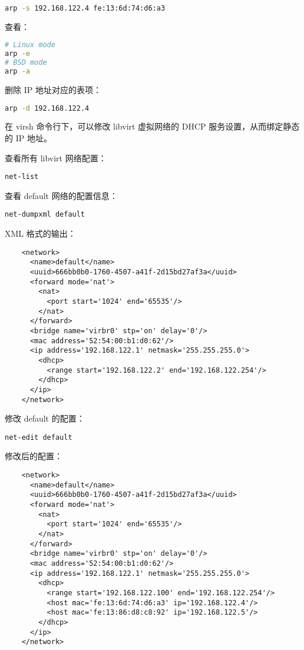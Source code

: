 \begin{enumerate}
\begin{lstlisting}[language=bash]
arp -s 192.168.122.4 fe:13:6d:74:d6:a3
\end{lstlisting}

查看：

\begin{lstlisting}[language=bash]
# Linux mode
arp -e
# BSD mode
arp -a
\end{lstlisting}

删除 IP 地址对应的表项：

\begin{lstlisting}[language=bash]
arp -d 192.168.122.4
\end{lstlisting}

在 virsh 命令行下，可以修改 libvirt 虚拟网络的 DHCP 服务设置，从而绑定静态的 IP 地址。

查看所有 libvirt 网络配置：

\begin{lstlisting}
net-list
\end{lstlisting}

查看 default 网络的配置信息：

\begin{lstlisting}
net-dumpxml default
\end{lstlisting}

XML 格式的输出：

\begin{lstlisting}
    <network>
      <name>default</name>
      <uuid>666bb0b0-1760-4507-a41f-2d15bd27af3a</uuid>
      <forward mode='nat'>
        <nat>
          <port start='1024' end='65535'/>
        </nat>
      </forward>
      <bridge name='virbr0' stp='on' delay='0'/>
      <mac address='52:54:00:b1:d0:62'/>
      <ip address='192.168.122.1' netmask='255.255.255.0'>
        <dhcp>
          <range start='192.168.122.2' end='192.168.122.254'/>
        </dhcp>
      </ip>
    </network>
\end{lstlisting}

修改 default 的配置：

\begin{lstlisting}
net-edit default
\end{lstlisting}

修改后的配置：

\begin{lstlisting}
    <network>
      <name>default</name>
      <uuid>666bb0b0-1760-4507-a41f-2d15bd27af3a</uuid>
      <forward mode='nat'>
        <nat>
          <port start='1024' end='65535'/>
        </nat>
      </forward>
      <bridge name='virbr0' stp='on' delay='0'/>
      <mac address='52:54:00:b1:d0:62'/>
      <ip address='192.168.122.1' netmask='255.255.255.0'>
        <dhcp>
          <range start='192.168.122.100' end='192.168.122.254'/>
          <host mac='fe:13:6d:74:d6:a3' ip='192.168.122.4'/>
          <host mac='fe:13:86:d8:c8:92' ip='192.168.122.5'/>
        </dhcp>
      </ip>
    </network>
\end{lstlisting}


\end{enumerate}
